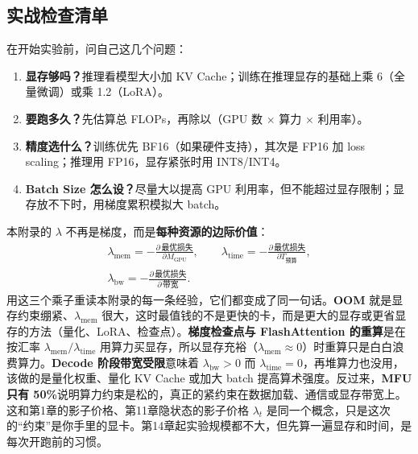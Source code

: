 \subsection*{实战检查清单}

在开始实验前，问自己这几个问题：

\begin{enumerate}
    \item \textbf{显存够吗？}推理看模型大小加 KV Cache；训练在推理显存的基础上乘 6（全量微调）或乘 1.2（LoRA）。
    \item \textbf{要跑多久？}先估算总 FLOPs，再除以（GPU 数 $\times$ 算力 $\times$ 利用率）。
    \item \textbf{精度选什么？}训练优先 BF16（如果硬件支持），其次是 FP16 加 loss scaling；推理用 FP16，显存紧张时用 INT8/INT4。
    \item \textbf{Batch Size 怎么设？}尽量大以提高 GPU 利用率，但不能超过显存限制；显存放不下时，用梯度累积模拟大 batch。
\end{enumerate}

\begin{physicalmeaning}[title=$\lambda$ 在本附录的意义：资源的影子价格]
本附录的 $\lambda$ 不再是梯度，而是\textbf{每种资源的边际价值}：
\begin{gather*}
\lambda_{\text{mem}} = -\frac{\partial\,\text{最优损失}}{\partial M_{\text{GPU}}}, \qquad
\lambda_{\text{time}} = -\frac{\partial\,\text{最优损失}}{\partial T_{\text{预算}}}, \\
\lambda_{\text{bw}} = -\frac{\partial\,\text{最优损失}}{\partial\,\text{带宽}}.
\end{gather*}
用这三个乘子重读本附录的每一条经验，它们都变成了同一句话。\textbf{OOM} 就是显存约束绷紧、$\lambda_{\text{mem}}$ 很大，这时最值钱的不是更快的卡，而是更大的显存或更省显存的方法（量化、LoRA、检查点）。\textbf{梯度检查点与 FlashAttention 的重算}是在按汇率 $\lambda_{\text{mem}}/\lambda_{\text{time}}$ 用算力买显存，所以显存充裕（$\lambda_{\text{mem}} \approx 0$）时重算只是白白浪费算力。\textbf{Decode 阶段带宽受限}意味着 $\lambda_{\text{bw}} > 0$ 而 $\lambda_{\text{time}} = 0$，再堆算力也没用，该做的是量化权重、量化 KV Cache 或加大 batch 提高算术强度。反过来，\textbf{MFU 只有 50\%}说明算力约束是松的，真正的紧约束在数据加载、通信或显存带宽上。这和第1章的影子价格、第11章隐状态的影子价格 $\lambda_t$ 是同一个概念，只是这次的“约束”是你手里的显卡。第14章起实验规模都不大，但先算一遍显存和时间，是每次开跑前的习惯。
\end{physicalmeaning}

